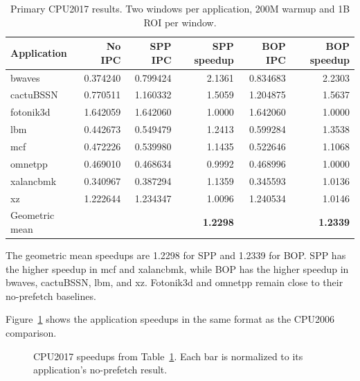 \documentclass[a4paper,11pt]{article}
\begin{document}
\begin{table}[htbp]
\centering\small
\caption{Primary CPU2017 results. Two windows per application, 200M warmup and 1B ROI per window.}\label{tab:cpu2017}
\begin{tabular}{@{}lrrrrr@{}}
\toprule
Application & No IPC & SPP IPC & SPP speedup & BOP IPC & BOP speedup\\
\midrule
bwaves & 0.374240 & 0.799424 & 2.1361 & 0.834683 & 2.2303\\
cactuBSSN & 0.770511 & 1.160332 & 1.5059 & 1.204875 & 1.5637\\
fotonik3d & 1.642059 & 1.642060 & 1.0000 & 1.642060 & 1.0000\\
lbm & 0.442673 & 0.549479 & 1.2413 & 0.599284 & 1.3538\\
mcf & 0.472226 & 0.539980 & 1.1435 & 0.522646 & 1.1068\\
omnetpp & 0.469010 & 0.468634 & 0.9992 & 0.468996 & 1.0000\\
xalancbmk & 0.340967 & 0.387294 & 1.1359 & 0.345593 & 1.0136\\
xz & 1.222644 & 1.234347 & 1.0096 & 1.240534 & 1.0146\\
\midrule
Geometric mean & & & \textbf{1.2298} & & \textbf{1.2339}\\
\bottomrule
\end{tabular}
\end{table}

The geometric mean speedups are 1.2298 for SPP and 1.2339 for BOP. SPP has the higher speedup in mcf and xalancbmk, while BOP has the higher speedup in bwaves, cactuBSSN, lbm, and xz. Fotonik3d and omnetpp remain close to their no-prefetch baselines.

Figure~\ref{fig:cpu2017} shows the application speedups in the same format as the CPU2006 comparison.
\begin{figure}[htbp]
\centering
{}
\caption{CPU2017 speedups from Table~\ref{tab:cpu2017}. Each bar is normalized to its application's no-prefetch result.}\label{fig:cpu2017}
\end{figure}
\FloatBarrier
\end{document}
